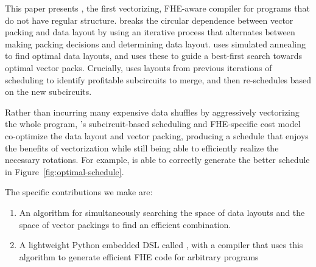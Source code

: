 This paper presents \system, the first vectorizing, FHE-aware compiler for programs that do not have regular structure. \system breaks the circular dependence between vector packing and data layout by using an iterative process that alternates between making packing decisions and determining data layout. \system uses simulated annealing to find optimal data layouts, and uses these to guide a best-first search towards optimal vector packs. Crucially, \system uses layouts from previous iterations of scheduling to identify profitable subcircuits to merge, and then re-schedules based on the new subcircuits.


Rather than incurring many expensive data shuffles by aggressively vectorizing the whole program, \system's subcircuit-based scheduling and FHE-specific cost model co-optimize the data layout and vector packing, producing a schedule that enjoys the benefits of vectorization while still being able to efficiently realize the necessary rotations. For example, \system is able to correctly generate the better schedule in Figure~\ref{fig:optimal-schedule}.





The specific contributions we make are:
\begin{enumerate}
    \item An algorithm for simultaneously searching the space of data layouts and the space of vector packings to find an efficient combination. %
    \item A lightweight Python embedded DSL called \system, with a compiler that uses this algorithm to generate efficient FHE code for arbitrary programs
\end{enumerate}

